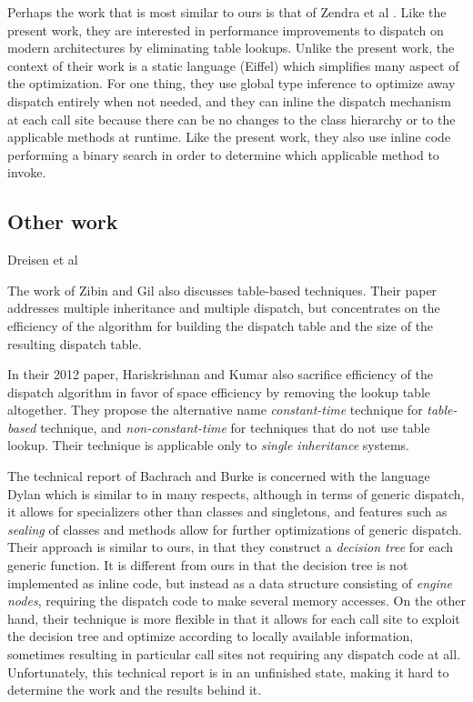 Perhaps the work that is most similar to ours is that of Zendra et al
\cite{Zendra:1997:EDD:263698.263728}.  Like the present work, they are
interested in performance improvements to dispatch on modern
architectures by eliminating table lookups.  Unlike the present work,
the context of their work is a static language (Eiffel) which
simplifies many aspect of the optimization.  For one thing, they use
global type inference to optimize away dispatch entirely when not
needed, and they can inline the dispatch mechanism at each call site
because there can be no changes to the class hierarchy or to the
applicable methods at runtime.  Like the present work, they also use
inline code performing a binary search in order to determine which
applicable method to invoke.

\subsection{Other work}

Dreisen et al \cite{Driesen:1995:MDP:646153.679537}

The work of Zibin and Gil \cite{Zibin:2002:FAC:582419.582434} also
discusses table-based techniques.  Their paper addresses multiple
inheritance and multiple dispatch, but concentrates on the efficiency
of the algorithm for building the dispatch table and the size of the
resulting dispatch table. 

In their 2012 paper, Hariskrishnan and Kumar
\cite{Harikrishnan:2012:SEN:2108144.2108153} also sacrifice efficiency
of the dispatch algorithm in favor of space efficiency by removing the
lookup table altogether.  They propose the alternative name
\emph{constant-time} technique for \emph{table-based} technique, and
\emph{non-constant-time} for techniques that do not use table lookup.
Their technique is applicable only to \emph{single inheritance} systems. 

The technical report of Bachrach and Burke \cite{Bachrach:2000} is
concerned with the language Dylan which is similar to \cl{} in many
respects, although in terms of generic dispatch, it allows for
specializers other than classes and singletons, and features such as
\emph{sealing} of classes and methods allow for further optimizations
of generic dispatch.  Their approach is similar to ours, in that they
construct a \emph{decision tree} for each generic function.  It is
different from ours in that the decision tree is not implemented as
inline code, but instead as a data structure consisting of
\emph{engine nodes}, requiring the dispatch code to make several
memory accesses.  On the other hand, their technique is more flexible
in that it allows for each call site to exploit the decision tree and
optimize according to locally available information, sometimes
resulting in particular call sites not requiring any dispatch code at
all.  Unfortunately, this technical report is in an unfinished state,
making it hard to determine the work and the results behind it.


